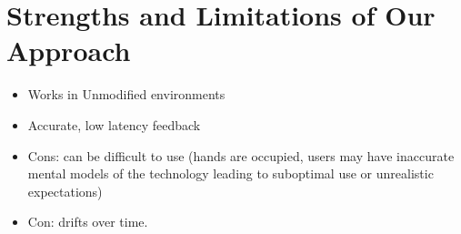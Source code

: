 \documentclass[chi]{sigchi}
\begin{document}
%
%
%
%

\section{Strengths and Limitations of Our Approach}
\begin{itemize}
\item Works in Unmodified environments
\item Accurate, low latency feedback
\item Cons: can be difficult to use (hands are occupied, users may have inaccurate mental models of the technology leading to suboptimal use or unrealistic expectations)
\item Con: drifts over time.
\end{itemize}
\end{document}
